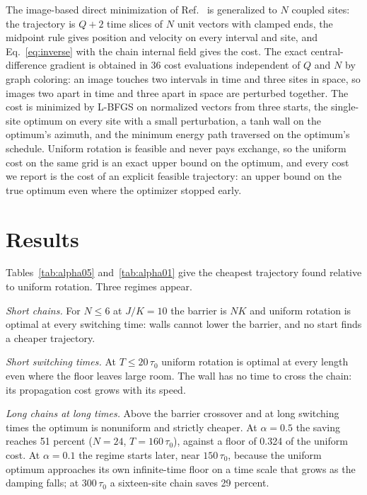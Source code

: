 \documentclass[11pt]{article}
\begin{document}
The image-based direct minimization of Ref.~\citep{badarneh2023} is generalized to $N$ coupled sites:
the trajectory is $Q+2$ time slices of $N$ unit vectors with clamped ends, the midpoint rule gives
position and velocity on every interval and site, and Eq.~\eqref{eq:inverse} with the chain internal
field gives the cost. The exact central-difference gradient is obtained in 36 cost evaluations
independent of $Q$ and $N$ by graph coloring: an image touches two intervals in time and three sites in
space, so images two apart in time and three apart in space are perturbed together. The cost is
minimized by L-BFGS on normalized vectors from three starts, the single-site optimum on every site with a
small perturbation, a tanh wall on the optimum's azimuth, and the minimum energy path traversed on the
optimum's schedule. Uniform rotation is feasible and never pays exchange, so the uniform cost on the
same grid is an exact upper bound on the optimum, and every cost we report is the cost of an explicit
feasible trajectory: an upper bound on the true optimum even where the optimizer stopped early.




\section{Results}

Tables~\ref{tab:alpha05} and~\ref{tab:alpha01} give the cheapest trajectory found relative to uniform
rotation. Three regimes appear.

\emph{Short chains.} For $N \le 6$ at $J/K = 10$ the barrier is $NK$ and uniform rotation is optimal at
every switching time: walls cannot lower the barrier, and no start finds a cheaper trajectory.

\emph{Short switching times.} At $T \le 20\,\tau_0$ uniform rotation is optimal at every length even
where the floor leaves large room. The wall has no time to cross the chain: its propagation cost grows
with its speed.

\emph{Long chains at long times.} Above the barrier crossover and at long switching times the optimum is
nonuniform and strictly cheaper. At $\alpha = 0.5$ the saving reaches 51 percent ($N=24$,
$T=160\,\tau_0$), against a floor of 0.324 of the uniform cost. At $\alpha = 0.1$ the regime starts
later, near $150\,\tau_0$, because the uniform optimum approaches its own infinite-time floor on a time
scale that grows as the damping falls; at $300\,\tau_0$ a sixteen-site chain saves 29 percent.
\end{document}
